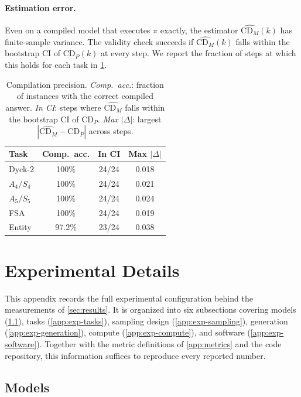 \documentclass[11pt]{article}
\newcommand{\CDP}{\mathrm{CD}_{P}}
\newcommand{\CDM}{\mathrm{CD}_{M}}
\newcommand{\stepk}{k}
\begin{document}
\paragraph{Estimation error.}
Even on a compiled model that executes $\pi$ exactly, the estimator
$\widehat{\CDM}(\stepk)$ has finite-sample variance. The validity check
succeeds if $\widehat{\CDM}(\stepk)$ falls within the bootstrap CI of
$\CDP(\stepk)$ at every step. We report the fraction of steps at which this
holds for each task in \cref{tab:compile-precision}.

\begin{table}[t]
\centering\small
\setlength{\tabcolsep}{3pt}
\begin{tabular}{@{}lccc@{}}
\toprule
Task & Comp.\ acc. & In CI & Max $|\Delta|$ \\
\midrule
Dyck-2    & 100\% & 24/24 & 0.018 \\
$A_4/S_4$ & 100\% & 24/24 & 0.021 \\
$A_5/S_5$ & 100\% & 24/24 & 0.024 \\
FSA       & 100\% & 24/24 & 0.019 \\
Entity    & 97.2\% & 23/24 & 0.038 \\
\bottomrule
\end{tabular}
\caption{Compilation precision. \emph{Comp.\ acc.}: fraction of instances
with the correct compiled answer. \emph{In CI}: steps where $\widehat{\CDM}$
falls within the bootstrap CI of $\CDP$. \emph{Max $|\Delta|$}: largest
$|\widehat{\CDM}-\CDP|$ across steps.}
\label{tab:compile-precision}
\end{table}

\section{Experimental Details}
\label{app:exp}

This appendix records the full experimental configuration behind the
measurements of \cref{sec:results}. It is organized into six subsections
covering models (\cref{app:exp-models}), tasks (\cref{app:exp-tasks}), sampling
design (\cref{app:exp-sampling}), generation (\cref{app:exp-generation}),
compute (\cref{app:exp-compute}), and software (\cref{app:exp-software}).
Together with the metric definitions of \cref{app:metrics} and the code
repository, this information suffices to reproduce every reported number.

\subsection{Models}
\label{app:exp-models}
\end{document}
